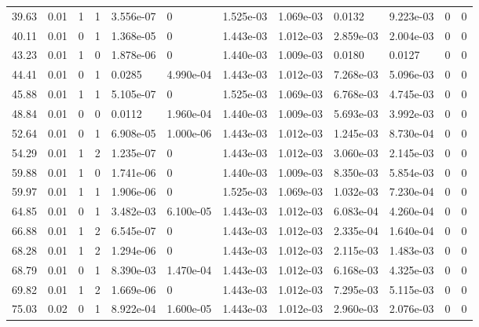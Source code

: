 \documentclass[preview]{standalone}
\begin{document}
{{\begin{tabular}{L{1.2cm}C{1.2cm} C{0.3cm}C{0.5cm} C{1.4cm}C{1.4cm} C{1.4cm}C{1.4cm} C{1.6cm}C{1.6cm} C{1.6cm}C{1.6cm}}
  39.63  &  0.01  & 1     &  1 &  3.556e-07  & 0  &  1.525e-03&   1.069e-03& 0.0132 & 9.223e-03   &  0 & 0  \\ 
  40.11  &  0.01  & 0     &  1 &  1.368e-05  & 0  &  1.443e-03&   1.012e-03& 2.859e-03 & 2.004e-03   &  0 & 0  \\ 
  43.23  &  0.01  & 1     &  0 &  1.878e-06  & 0  &  1.440e-03&   1.009e-03& 0.0180 & 0.0127   &  0 & 0  \\ 
  44.41  &  0.01  & 0     &  1 &  0.0285  & 4.990e-04  &  1.443e-03&   1.012e-03& 7.268e-03 & 5.096e-03   &  0 & 0  \\ 
  45.88  &  0.01  & 1     &  1 &  5.105e-07  & 0  &  1.525e-03&   1.069e-03& 6.768e-03 & 4.745e-03   &  0 & 0  \\ 
  48.84  &  0.01  & 0     &  0 &  0.0112  & 1.960e-04  &  1.440e-03&   1.009e-03& 5.693e-03 & 3.992e-03   &  0 & 0  \\ 
  52.64  &  0.01  & 0     &  1 &  6.908e-05  & 1.000e-06  &  1.443e-03&   1.012e-03& 1.245e-03 & 8.730e-04   &  0 & 0  \\ 
  54.29  &  0.01  & 1     &  2 &  1.235e-07  & 0  &  1.443e-03&   1.012e-03& 3.060e-03 & 2.145e-03   &  0 & 0  \\ 
  59.88  &  0.01  & 1     &  0 &  1.741e-06  & 0  &  1.440e-03&   1.009e-03& 8.350e-03 & 5.854e-03   &  0 & 0  \\ 
  59.97  &  0.01  & 1     &  1 &  1.906e-06  & 0  &  1.525e-03&   1.069e-03& 1.032e-03 & 7.230e-04   &  0 & 0  \\ 
  64.85  &  0.01  & 0     &  1 &  3.482e-03  & 6.100e-05  &  1.443e-03&   1.012e-03& 6.083e-04 & 4.260e-04   &  0 & 0  \\ 
  66.88  &  0.01  & 1     &  2 &  6.545e-07  & 0  &  1.443e-03&   1.012e-03& 2.335e-04 & 1.640e-04   &  0 & 0  \\ 
  68.28  &  0.01  & 1     &  2 &  1.294e-06  & 0  &  1.443e-03&   1.012e-03& 2.115e-03 & 1.483e-03   &  0 & 0  \\ 
  68.79  &  0.01  & 0     &  1 &  8.390e-03  & 1.470e-04  &  1.443e-03&   1.012e-03& 6.168e-03 & 4.325e-03   &  0 & 0  \\ 
  69.82  &  0.01  & 1     &  2 &  1.669e-06  & 0  &  1.443e-03&   1.012e-03& 7.295e-03 & 5.115e-03   &  0 & 0  \\ 
  75.03  &  0.02  & 0     &  1 &  8.922e-04  & 1.600e-05  &  1.443e-03&   1.012e-03& 2.960e-03 & 2.076e-03   &  0 & 0  \\ 
\hline 
\end{tabular} 

}}
\end{document}
